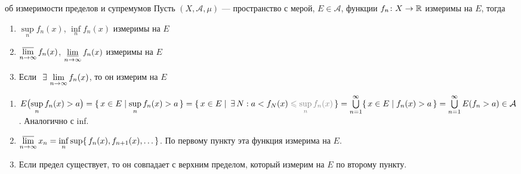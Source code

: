 
\begin{teor}[https://www.youtube.com/live/D_Nn53jVQxE?si=W2eSV2WkULR551h2&t=10108]{об измеримости пределов и супремумов}
	Пусть $(X, \mathcal A, \mu)$ --- пространство с мерой, $E \in \mathcal{A}$, функции $f_n \colon X \to \mathbb R$ измеримы на $E$, тогда
	\begin{enumerate} \makeatletter\renewcommand{\p@enumi}{\theteor.}\makeatother
	\item $\sup\limits_n f_n(x)$, $\inf\limits_n f_n(x)$ измеримы на $E$
		
	\item $\varlimsup\limits_{n \to \infty} f_n(x)$, $\varliminf\limits_{n \to \infty} f_n(x)$ измеримы на $E$
	
	\item\label{изм.пред.} Если$\E \lim\limits_{n \to \infty} f_n(x)$, то он измерим на $E$
	\end{enumerate} 
\end{teor}

\begin{prf}
	\begin{enumerate}
		\item $E\bigl(\sup\limits_n f_n(x) > a\bigr) = \{\, x \in E \mid \sup\limits_n f_n(x) > a \,\} = \{\,x \in E \mid \!\!\!\E N : a < f_N(x) \uns{{}\< \sup\limits_n f_n(x)}\,\} = \bigcup\limits_{n = 1}^\infty \{\, x \in E \mid f_n(x) > a \,\} = \bigcup\limits_{n = 1}^\infty E (f_n > a) \in \mathcal A$. Аналогично с inf.
		
		\item $\varlimsup\limits_{n \to \infty} x_n = \inf\limits_n \sup \{\, f_n(x), f_{n + 1}(x), \ldots\,\}$. По первому пункту эта функция измерима на $E$.
		
		\item Если предел существует, то он совпадает с верхним пределом, который измерим на $E$ по второму пункту.
	\end{enumerate}
\end{prf}


